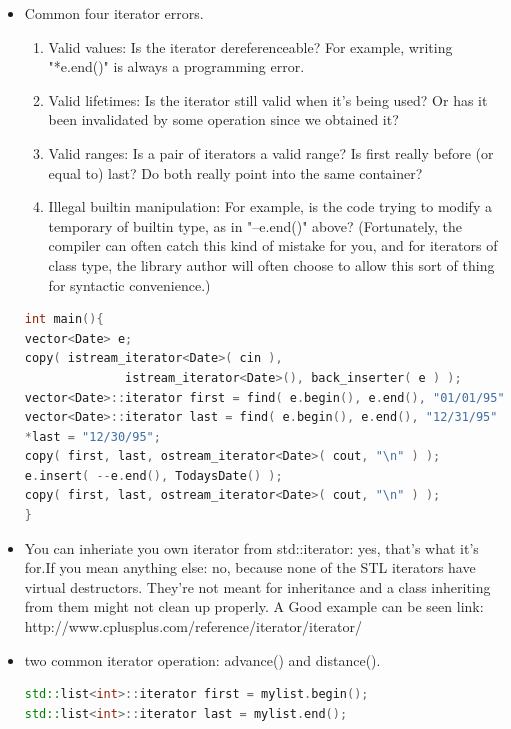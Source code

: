 \documentclass[a4paper,11pt,twoside]{book}
\begin{document}
\begin{itemize}
\item Common four iterator errors.
\begin{enumerate}
\item Valid values: Is the iterator dereferenceable? For example, writing "*e.end()" is always a programming error.
\item Valid lifetimes: Is the iterator still valid when it's being used? Or has it been invalidated by some
operation since we obtained it?

\item Valid ranges: Is a pair of iterators a valid range? Is first really before (or equal to) last? Do
both really point into the same container?
\item Illegal builtin manipulation: For example, is the code trying to modify a temporary of builtin
type, as in "--e.end()" above? (Fortunately, the compiler can often catch this kind of mistake
for you, and for iterators of class type, the library author will often choose to allow this sort of
thing for syntactic convenience.)


\end{enumerate}


\begin{lstlisting}[frame=single, language=c++]
int main(){
vector<Date> e;
copy( istream_iterator<Date>( cin ), 
              istream_iterator<Date>(), back_inserter( e ) );
vector<Date>::iterator first = find( e.begin(), e.end(), "01/01/95" );
vector<Date>::iterator last = find( e.begin(), e.end(), "12/31/95" );
*last = "12/30/95";
copy( first, last, ostream_iterator<Date>( cout, "\n" ) );
e.insert( --e.end(), TodaysDate() );
copy( first, last, ostream_iterator<Date>( cout, "\n" ) );
}
\end{lstlisting}


\item You can inheriate you own iterator from std::iterator: yes, that's what it's for.If you mean anything else: no, because none of the STL iterators have virtual destructors. They're not meant for inheritance and a class inheriting from them might not clean up properly. A Good example can be seen link: \\ http://www.cplusplus.com/reference/iterator/iterator/

\item two common iterator operation:  advance() and distance().
\begin{lstlisting}[frame=single, language=c++]
std::list<int>::iterator first = mylist.begin();
std::list<int>::iterator last = mylist.end();


\end{lstlisting}
\end{itemize}
\end{document}

